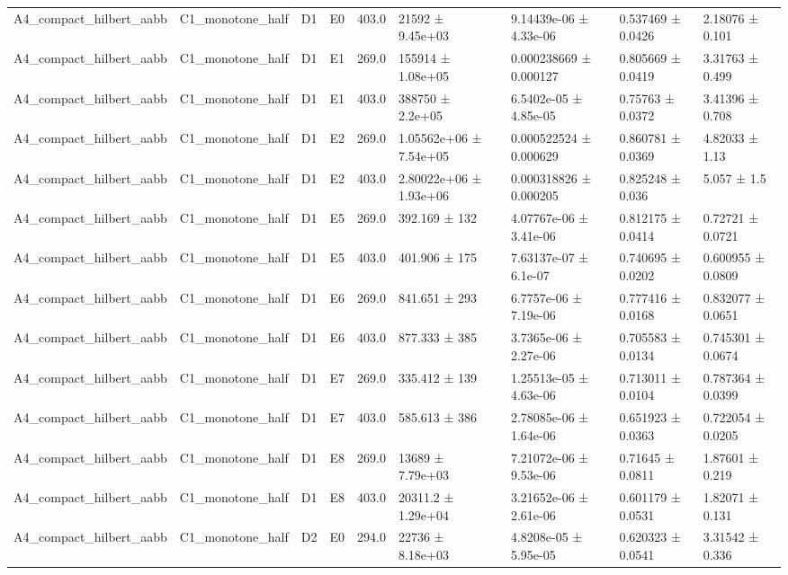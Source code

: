 \begin{table}
\begin{tabular}{lllllllll}
A4\_compact\_hilbert\_aabb & C1\_monotone\_half & D1 & E0 & 403.0 & 21592 ± 9.45e+03 & 9.14439e-06 ± 4.33e-06 & 0.537469 ± 0.0426 & 2.18076 ± 0.101 \\
A4\_compact\_hilbert\_aabb & C1\_monotone\_half & D1 & E1 & 269.0 & 155914 ± 1.08e+05 & 0.000238669 ± 0.000127 & 0.805669 ± 0.0419 & 3.31763 ± 0.499 \\
A4\_compact\_hilbert\_aabb & C1\_monotone\_half & D1 & E1 & 403.0 & 388750 ± 2.2e+05 & 6.5402e-05 ± 4.85e-05 & 0.75763 ± 0.0372 & 3.41396 ± 0.708 \\
A4\_compact\_hilbert\_aabb & C1\_monotone\_half & D1 & E2 & 269.0 & 1.05562e+06 ± 7.54e+05 & 0.000522524 ± 0.000629 & 0.860781 ± 0.0369 & 4.82033 ± 1.13 \\
A4\_compact\_hilbert\_aabb & C1\_monotone\_half & D1 & E2 & 403.0 & 2.80022e+06 ± 1.93e+06 & 0.000318826 ± 0.000205 & 0.825248 ± 0.036 & 5.057 ± 1.5 \\
A4\_compact\_hilbert\_aabb & C1\_monotone\_half & D1 & E5 & 269.0 & 392.169 ± 132 & 4.07767e-06 ± 3.41e-06 & 0.812175 ± 0.0414 & 0.72721 ± 0.0721 \\
A4\_compact\_hilbert\_aabb & C1\_monotone\_half & D1 & E5 & 403.0 & 401.906 ± 175 & 7.63137e-07 ± 6.1e-07 & 0.740695 ± 0.0202 & 0.600955 ± 0.0809 \\
A4\_compact\_hilbert\_aabb & C1\_monotone\_half & D1 & E6 & 269.0 & 841.651 ± 293 & 6.7757e-06 ± 7.19e-06 & 0.777416 ± 0.0168 & 0.832077 ± 0.0651 \\
A4\_compact\_hilbert\_aabb & C1\_monotone\_half & D1 & E6 & 403.0 & 877.333 ± 385 & 3.7365e-06 ± 2.27e-06 & 0.705583 ± 0.0134 & 0.745301 ± 0.0674 \\
A4\_compact\_hilbert\_aabb & C1\_monotone\_half & D1 & E7 & 269.0 & 335.412 ± 139 & 1.25513e-05 ± 4.63e-06 & 0.713011 ± 0.0104 & 0.787364 ± 0.0399 \\
A4\_compact\_hilbert\_aabb & C1\_monotone\_half & D1 & E7 & 403.0 & 585.613 ± 386 & 2.78085e-06 ± 1.64e-06 & 0.651923 ± 0.0363 & 0.722054 ± 0.0205 \\
A4\_compact\_hilbert\_aabb & C1\_monotone\_half & D1 & E8 & 269.0 & 13689 ± 7.79e+03 & 7.21072e-06 ± 9.53e-06 & 0.71645 ± 0.0811 & 1.87601 ± 0.219 \\
A4\_compact\_hilbert\_aabb & C1\_monotone\_half & D1 & E8 & 403.0 & 20311.2 ± 1.29e+04 & 3.21652e-06 ± 2.61e-06 & 0.601179 ± 0.0531 & 1.82071 ± 0.131 \\
A4\_compact\_hilbert\_aabb & C1\_monotone\_half & D2 & E0 & 294.0 & 22736 ± 8.18e+03 & 4.8208e-05 ± 5.95e-05 & 0.620323 ± 0.0541 & 3.31542 ± 0.336 \\

\end{tabular}
\end{table}
